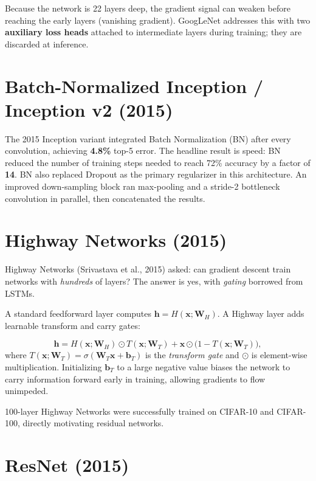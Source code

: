 \documentclass[11pt, oneside]{book}
\newcommand{\xvec}{\mathbf{x}}
\newcommand{\hvec}{\mathbf{h}}
\begin{document}
Because the network is 22 layers deep, the gradient signal can weaken before
reaching the early layers (vanishing gradient).
GoogLeNet addresses this with two \textbf{auxiliary loss heads} attached to
intermediate layers during training; they are discarded at inference.

\section{Batch-Normalized Inception / Inception v2 (2015)}

The 2015 Inception variant integrated Batch Normalization (BN) after every
convolution, achieving \textbf{4.8\%} top-5 error.
The headline result is speed: BN reduced the number of training steps needed to
reach 72\% accuracy by a factor of \textbf{14}.
BN also replaced Dropout as the primary regularizer in this architecture.
An improved down-sampling block ran max-pooling and a stride-2 bottleneck
convolution in parallel, then concatenated the results.

\section{Highway Networks (2015)}

Highway Networks (Srivastava et al., 2015) asked: can gradient descent train
networks with \emph{hundreds} of layers?
The answer is yes, with \emph{gating} borrowed from LSTMs.

A standard feedforward layer computes $\hvec = H(\xvec; \mathbf{W}_H)$.
A Highway layer adds learnable transform and carry gates:

\begin{thmbox}[title={Highway Network Layer}]
\[
  \hvec = H(\xvec;\mathbf{W}_H) \odot T(\xvec;\mathbf{W}_T)
        + \xvec \odot \bigl(1 - T(\xvec;\mathbf{W}_T)\bigr),
\]
where $T(\xvec;\mathbf{W}_T) = \sigma(\mathbf{W}_T\xvec + \mathbf{b}_T)$ is the
\emph{transform gate} and $\odot$ is element-wise multiplication.
Initializing $\mathbf{b}_T$ to a large negative value biases the network to carry
information forward early in training, allowing gradients to flow unimpeded.
\end{thmbox}

100-layer Highway Networks were successfully trained on CIFAR-10 and CIFAR-100,
directly motivating residual networks.

\section{ResNet (2015)}
\end{document}

